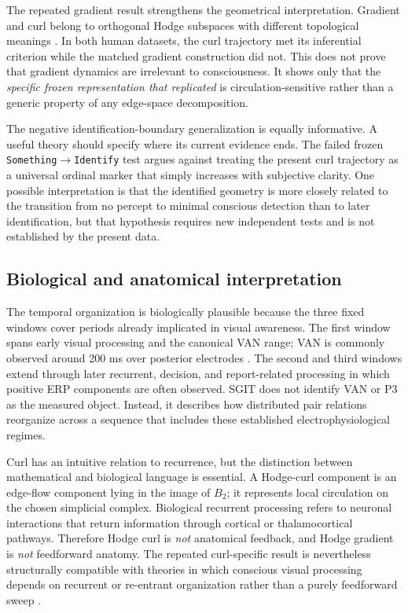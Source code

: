 \documentclass[12pt]{article}
\begin{document}
The repeated gradient result strengthens the geometrical interpretation. Gradient and curl belong to orthogonal Hodge subspaces with different topological meanings \citep{Jiang2011,BarbarossaSardellitti2020,Schaub2021}. In both human datasets, the curl trajectory met its inferential criterion while the matched gradient construction did not. This does not prove that gradient dynamics are irrelevant to consciousness. It shows only that the \emph{specific frozen representation that replicated} is circulation-sensitive rather than a generic property of any edge-space decomposition.

The negative identification-boundary generalization is equally informative. A useful theory should specify where its current evidence ends. The failed frozen \texttt{Something}$\rightarrow$\texttt{Identify} test argues against treating the present curl trajectory as a universal ordinal marker that simply increases with subjective clarity. One possible interpretation is that the identified geometry is more closely related to the transition from no percept to minimal conscious detection than to later identification, but that hypothesis requires new independent tests and is not established by the present data.

\subsection{Biological and anatomical interpretation}
The temporal organization is biologically plausible because the three fixed windows cover periods already implicated in visual awareness. The first window spans early visual processing and the canonical VAN range; VAN is commonly observed around 200 ms over posterior electrodes \citep{KoivistoRevonsuo2010,EklundWiens2018,Wiens2026}. The second and third windows extend through later recurrent, decision, and report-related processing in which positive ERP components are often observed. SGIT does not identify VAN or P3 as the measured object. Instead, it describes how distributed pair relations reorganize across a sequence that includes these established electrophysiological regimes.

Curl has an intuitive relation to recurrence, but the distinction between mathematical and biological language is essential. A Hodge-curl component is an edge-flow component lying in the image of $B_2$; it represents local circulation on the chosen simplicial complex. Biological recurrent processing refers to neuronal interactions that return information through cortical or thalamocortical pathways. Therefore Hodge curl is \emph{not} anatomical feedback, and Hodge gradient is \emph{not} feedforward anatomy. The repeated curl-specific result is nevertheless structurally compatible with theories in which conscious visual processing depends on recurrent or re-entrant organization rather than a purely feedforward sweep \citep{LammeRoelfsema2000,Lamme2006}.
\end{document}
